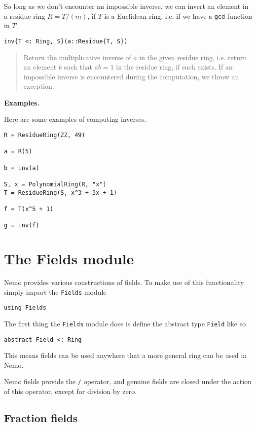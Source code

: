 \documentclass[a4paper,10pt]{article}
\newcommand{\code}{\lstinline}
\newcommand{\desc}[1]{\vspace{-3mm}\begin{quote}#1\end{quote}}
\begin{document}
{{{So long as we don't encounter an impossible inverse, we can
invert an element in a residue ring $R = T/(m)$, if $T$ is a
Euclidean ring, i.e. if we have a \code{gcd} function in $T$.

\begin{lstlisting}
inv{T <: Ring, S}(a::Residue{T, S})
\end{lstlisting}

\desc{Return the multiplicative inverse of $a$ in the given residue
ring, i.e. return an element $b$ such that $ab = 1$ in the residue ring,
if such exists. If an impossible inverse is encountered during the
computation, we throw an exception.}

\textbf{Examples.}

Here are some examples of computing inverses.

\begin{lstlisting}
R = ResidueRing(ZZ, 49)

a = R(5)

b = inv(a)

S, x = PolynomialRing(R, "x")
T = ResidueRing(S, x^3 + 3x + 1)

f = T(x^5 + 1)

g = inv(f)
\end{lstlisting}

\section{The Fields module}

Nemo provides various constructions of fields. To make use of this 
functionality simply import the \code{Fields} module

\begin{lstlisting}
using Fields
\end{lstlisting}

The first thing the \code{Fields} module does is define the abstract
type \code{Field} like so

\begin{lstlisting}
abstract Field <: Ring
\end{lstlisting}

This means fields can be used anywhere that a more general ring can be used
in Nemo.

Nemo fields provide the \code{/} operator, and genuine fields are closed under
the action of this operator, except for division by zero.

\subsection{Fraction fields}

}}}
\end{document}
